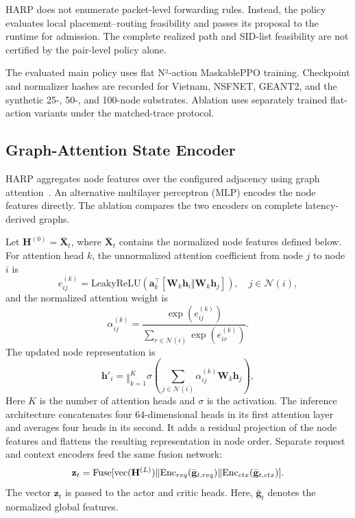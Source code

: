 \documentclass[final,5p]{elsarticle}
\newcommand{\rev}[1]{\textcolor{revisiongreen}{#1}}
\let\newrev\rev
\begin{document}
HARP does not enumerate packet-level forwarding rules. Instead, \rev{the policy evaluates local placement--routing feasibility and passes its proposal to the runtime for admission. The complete realized path and SID-list feasibility are not certified by the pair-level policy alone.}

\newrev{The evaluated main policy uses flat N²-action MaskablePPO training. Checkpoint and normalizer hashes are recorded for Vietnam, NSFNET, GEANT2, and the synthetic 25-, 50-, and 100-node substrates. Ablation uses separately trained flat-action variants under the matched-trace protocol.}

\subsection{Graph-Attention State Encoder}
\label{subsec:harp_gat}

\newrev{HARP aggregates node features over the configured adjacency using graph attention~\cite{velickovic2018graph}. An alternative multilayer perceptron (MLP) encodes the node features directly. The ablation compares the two encoders on complete latency-derived graphs.}

Let \rev{\(\mathbf{H}^{(0)}=\bar{\mathbf{X}}_t\), where \(\bar{\mathbf X}_t\) contains the normalized node features defined below.} For attention head \(k\), the unnormalized attention coefficient from node \(j\) to node \(i\) is
\begin{equation}
    e_{ij}^{(k)}
    =
    \mathrm{LeakyReLU}
    \left(
    \mathbf{a}_{k}^{\top}
    [\mathbf{W}_{k}\mathbf{h}_i \Vert \mathbf{W}_{k}\mathbf{h}_j]
    \right),
    \quad j\in\mathcal{N}(i),
\end{equation}
and the normalized attention weight is
\begin{equation}
    \alpha_{ij}^{(k)}
    =
    \frac{\exp(e_{ij}^{(k)})}
    {\sum_{r\in\mathcal{N}(i)}\exp(e_{ir}^{(k)})}.
\end{equation}
The updated node representation is
\begin{equation}
    \mathbf{h}'_i
    =
    \mathop{\Vert}_{k=1}^{K}
    \sigma
    \left(
    \sum_{j\in\mathcal{N}(i)}
    \alpha_{ij}^{(k)}\mathbf{W}_{k}\mathbf{h}_j
    \right),
\end{equation}
\newrev{Here \(K\) is the number of attention heads and \(\sigma\) is the activation. The inference architecture concatenates four 64-dimensional heads in its first attention layer and averages four heads in its second. It adds a residual projection of the node features and flattens the resulting representation in node order. Separate request and context encoders feed the same fusion network:}
\begin{equation}
\newrev{\mathbf{z}_t=\mathrm{Fuse}[\mathrm{vec}(\mathbf{H}^{(L)})\Vert\mathrm{Enc}_{req}(\bar{\mathbf g}_{t,req})\Vert\mathrm{Enc}_{ctx}(\bar{\mathbf g}_{t,ctx})].}
\end{equation}
The vector \(\mathbf{z}_t\) is passed to the actor and critic heads. \rev{Here, \(\bar{\mathbf g}_t\) denotes the normalized global features.}
\end{document}
